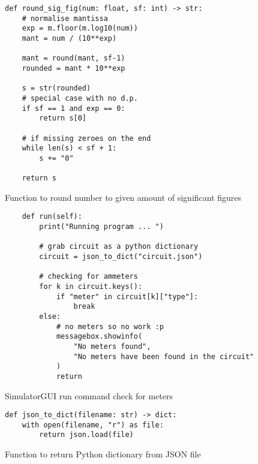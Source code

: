 \newpage
\begin{listing}[!ht]
    \begin{verbatim}
def round_sig_fig(num: float, sf: int) -> str:
    # normalise mantissa
    exp = m.floor(m.log10(num))
    mant = num / (10**exp)

    mant = round(mant, sf-1)
    rounded = mant * 10**exp
    
    s = str(rounded)
    # special case with no d.p.
    if sf == 1 and exp == 0:
        return s[0]
    
    # if missing zeroes on the end
    while len(s) < sf + 1:
        s += "0"
    
    return s
    \end{verbatim}
    \caption{Function to round number to given amount of significant figures}
    \label{sc:sigfigs-function}
\end{listing}

\newpage
\begin{listing}[!ht]
    \begin{verbatim}
    def run(self):
        print("Running program ... ")
        
        # grab circuit as a python dictionary        
        circuit = json_to_dict("circuit.json")

        # checking for ammeters
        for k in circuit.keys():
            if "meter" in circuit[k]["type"]:
                break
        else:
            # no meters so no work :p
            messagebox.showinfo(
                "No meters found",
                "No meters have been found in the circuit"
            )
            return
    \end{verbatim}
    \caption{SimulatorGUI run command check for meters}
    \label{sc:simgui-meter-check}
\end{listing}

\newpage
\begin{listing}[!ht]
    \begin{verbatim}
def json_to_dict(filename: str) -> dict:
    with open(filename, "r") as file:
        return json.load(file)
    \end{verbatim}
    \caption{Function to return Python dictionary from JSON file}
    \label{sc:json-to-dict-function}
\end{listing}

